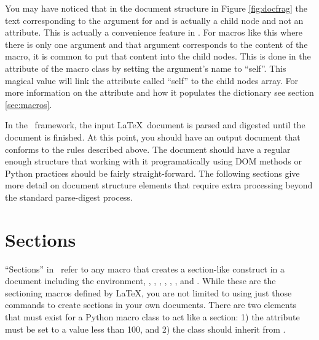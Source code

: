 You may have noticed that in the document structure in Figure \ref{fig:docfrag}
the text corresponding to the argument for  and  
is actually a child node and not an attribute.  This is actually a 
convenience feature in \plasTeX.  For macros like this where there is only
one argument and that argument corresponds to the content of the macro,
it is common to put that content into the child nodes.  This is done in
the  attribute of the macro class by setting the argument's
name to ``self''.  This magical value will link the attribute called 
``self'' to the child nodes array.  For more information on the 
attribute and how it populates the  dictionary see
section \ref{sec:macros}.

In the \plasTeX\ framework, the input \LaTeX\ document is parsed and 
digested until the document is finished.  At this point, you should have
an output document that conforms to the rules described above.  The 
document should have a regular enough structure that working with it
programatically using DOM methods or Python practices should be fairly
straight-forward.  The following sections give more detail on document
structure elements that require extra processing beyond the standard
parse-digest process.


\section{Sections\label{sec:sections}}

``Sections'' in \plasTeX\ refer to any macro that creates a section-like
construct in a document including the  environment,
, , , , 
, , and .
While these are the sectioning macros defined by \LaTeX, you are not limited
to using just those commands to create sections in your own documents.
There are two elements that must exist for a Python macro class to act
like a section: 1) the  attribute must be set to a value
less than 100, and 2) the class should inherit from 
.

